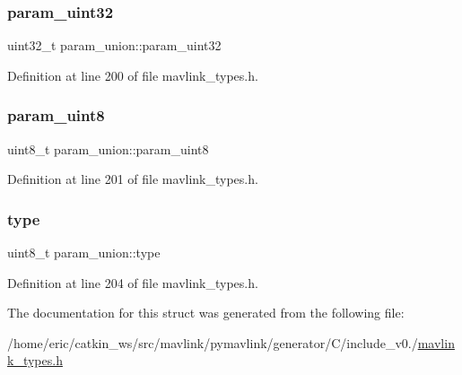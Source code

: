 \subsubsection{\texorpdfstring{param\_uint32}{param\_uint32}}
{\footnotesize\ttfamily uint32\+\_\+t param\+\_\+union\+::param\+\_\+uint32}



Definition at line 200 of file mavlink\+\_\+types.\+h.

\mbox{\label{structparam__union_ad3e573e92099cb9f0cfabf556a6c99a7}} 
\subsubsection{\texorpdfstring{param\_uint8}{param\_uint8}}
{\footnotesize\ttfamily uint8\+\_\+t param\+\_\+union\+::param\+\_\+uint8}



Definition at line 201 of file mavlink\+\_\+types.\+h.

\mbox{\label{structparam__union_a931bfe7edb069e632613635165968af6}} 
\subsubsection{\texorpdfstring{type}{type}}
{\footnotesize\ttfamily uint8\+\_\+t param\+\_\+union\+::type}



Definition at line 204 of file mavlink\+\_\+types.\+h.



The documentation for this struct was generated from the following file\+:\begin{DoxyCompactItemize}
\item 
/home/eric/catkin\+\_\+ws/src/mavlink/pymavlink/generator/\+C/include\+\_\+v0./\mbox{\hyperlink{include__v0_89_2mavlink__types_8h}{mavlink\+\_\+types.\+h}}\end{DoxyCompactItemize}
